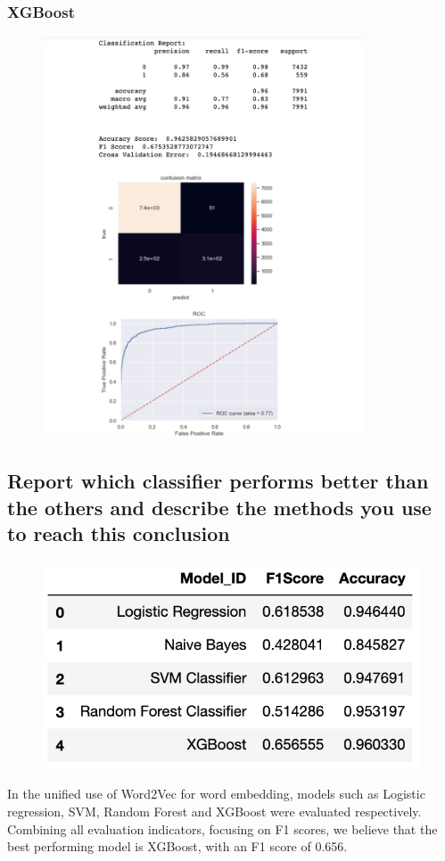 \documentclass{article}
\begin{document}
\subsubsection{XGBoost}
\begin{figure}[H]
    \centering
    \includegraphics[width=0.85\textwidth]{Fig8}
\end{figure}



\subsection{Report which classifier performs better than the others and describe the methods you use to reach this conclusion}
\begin{figure}[H]
    \centering
    \includegraphics[width=1\textwidth]{Fig9}
\end{figure}

In the unified use of Word2Vec for word embedding, models such as Logistic regression, SVM, Random Forest and XGBoost were evaluated respectively. Combining all evaluation indicators, focusing on F1 scores, we believe that the best performing model is XGBoost, with an F1 score of 0.656.
\end{document}
